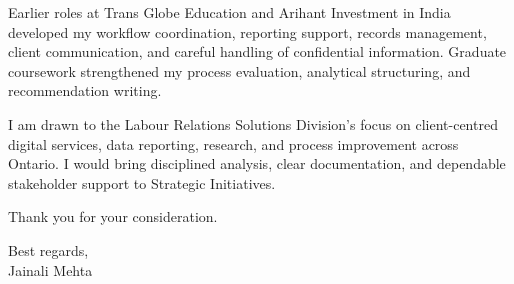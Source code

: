 \documentclass[letterpaper,10pt]{article}
\begin{document}
Earlier roles at Trans Globe Education and Arihant Investment in India developed my workflow coordination, reporting support, records management, client communication, and careful handling of confidential information. Graduate coursework strengthened my process evaluation, analytical structuring, and recommendation writing.

I am drawn to the Labour Relations Solutions Division's focus on client-centred digital services, data reporting, research, and process improvement across Ontario. I would bring disciplined analysis, clear documentation, and dependable stakeholder support to Strategic Initiatives.

Thank you for your consideration.

Best regards,\\[8pt]
Jainali Mehta
\end{document}
